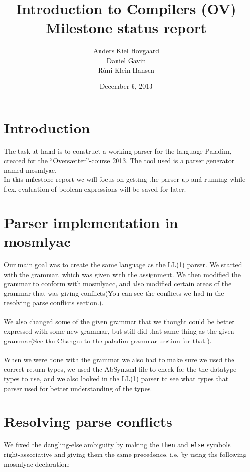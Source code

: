 \documentclass[12pt,a4paper]{article}
\begin{document}
\title{Introduction to Compilers (OV)\\
       Milestone status report}
\author{Anders Kiel Hovgaard\\
        Daniel Gavin\\
        Rúni Klein Hansen}
\date{December 6, 2013}
\maketitle

\section{Introduction}
The task at hand is to construct a working parser for the language Paladim,
created for the ``Oversætter''-course 2013. The tool used is a parser generator
named mosmlyac.\\
In this milestone report we will focus on getting the parser up and running
while f.ex. evaluation of boolean expressions will be saved for later.


\section{Parser implementation in mosmlyac}
Our main goal was to create the same language as the LL(1) parser. We started with the grammar, which was given with the 
assignment. We then modified the grammar to conform with mosmlyacc, and also modified certain areas of the grammar that was
giving conflicts(You can see the conflicts we had in the resolving parse conflicts section.). 
\\
\\
We also changed some of the given grammar that we thought could be better expressed with some new grammar, but still did that same thing as the given grammar(See the Changes to the paladim grammar section for that.).
\\
\\
When we were done with the grammar we also had to make sure we used the correct return types, we used the AbSyn.sml file to check for the
the datatype types to use, and we also looked in the LL(1) parser to see what types that parser used for better understanding of the 
types.


\section{Resolving parse conflicts}
We fixed the dangling-else ambiguity by making the \texttt{then} and
\texttt{else} symbols right-associative and giving them the same precedence,
i.e. by using the following mosmlyac declaration:
\end{document}
